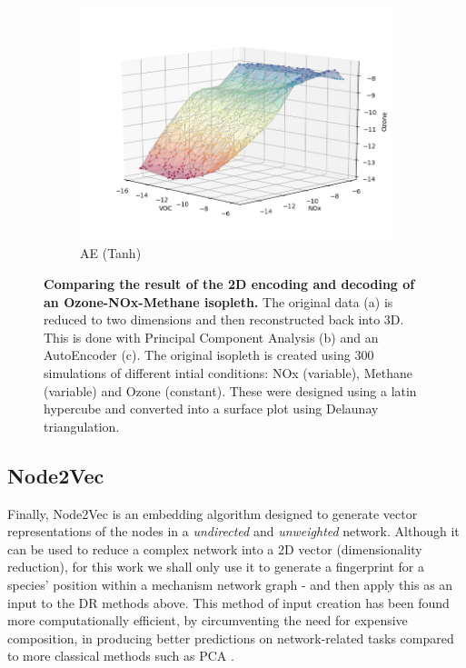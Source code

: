 \begin{figure}[H]
\begin{subfigure}{.33\textwidth}
  \includegraphics[width=\textwidth]{4fig/rae.png}
  \caption{AE (Tanh)}\label{fig:iae}
\end{subfigure}%
\caption{
\textbf{Comparing the result of the 2D encoding and decoding of an Ozone-NOx-Methane isopleth.} The original data (a) is reduced to two dimensions and then reconstructed back into 3D. This is done with Principal Component Analysis (b) and an AutoEncoder (c). The original isopleth is created using  300 simulations of different
 intial conditions: NOx (variable), Methane (variable) and Ozone (constant). These were designed using a latin hypercube and converted into a surface plot using Delaunay triangulation. }
\label{fig:aeiso}
\end{figure}

\subsection{Node2Vec}\label{sec:n2v}
Finally, Node2Vec is an embedding algorithm designed to generate vector representations of the nodes in a \textit{undirected} and \textit{unweighted} network. Although it can be used to reduce a complex network into a 2D vector (dimensionality reduction), for this work we shall only use it to generate a fingerprint for a species' position within a mechanism network graph - and then apply this as an input to the DR methods above. This method of input creation has been found more computationally efficient, by circumventing the need for expensive composition, in producing better predictions on network-related tasks compared to more classical methods such as PCA \citep{node2vec}.


